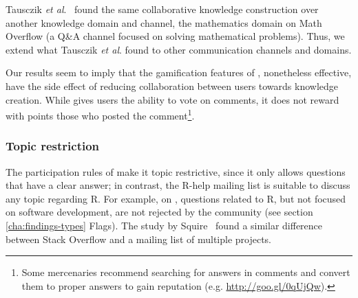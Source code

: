     Tausczik \textit{et al}.~\cite{Tausczik2014} found the same collaborative knowledge construction over another knowledge domain and channel, the mathematics domain on Math Overflow (a Q\&A channel focused on solving mathematical problems).
    Thus, we extend what Tausczik \textit{et al}. found to other communication channels and domains.

    Our results seem to imply that the gamification features of \SO, nonetheless effective, have the side effect of reducing collaboration between users towards knowledge creation.
    While \SO gives users the ability to vote on comments, it does not reward with points those who posted the comment\footnote{Some \SO \textsf{mercenaries}
      recommend searching for answers in comments and convert them to proper answers to gain reputation (e.g. \url{http://goo.gl/0qUjQw}).}.


\subsubsection{Topic restriction}

The participation rules of \SO make it topic restrictive, since it only allows questions that have a clear answer; in contrast, the R-help mailing list is suitable to discuss
any topic regarding R. For example, on \RH, questions related to R, but not focused on software development, are not rejected by the community (see section
\ref{cha:findings-types} Flags).
The study by Squire~\cite{Squire2015a} found a similar difference between Stack Overflow and a mailing list of multiple projects.

